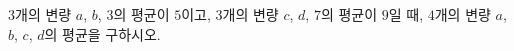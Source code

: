 $3$개의 변량 $a$, $b$, $3$의 평균이 $5$이고, $3$개의 변량 $c$, $d$, $7$의 평균이 $9$일 때, $4$개의 변량 $a$, $b$, $c$, $d$의 평균을 구하시오.
